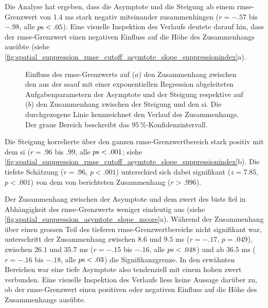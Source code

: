 \documentclass[11pt, twoside, a4paper]{book}		%
\begin{document}
Die Analyse hat ergeben, dass die Asymptote und die Steigung ab einem \gls{rmse}-Grenzwert von $1.4$ ms stark negativ miteinander zusammenhingen ($r=-.57$ bis $-.98$, alle $p\textnormal{s}<.05$). Eine visuelle Inspektion des Verlaufs deutete darauf hin, dass der \gls{rmse}-Grenzwert einen negativen Einfluss auf die Höhe des Zusammenhangs ausübte (siehe \autoref{fig:spatial_suppression_rmse_cutoff_asymtote_slope_suppressionindex}a).

\begin{figure}[htbp]
	\centering
	\begin{adjustbox}{width=1\textwidth}
	\end{adjustbox}
	\newline
	\begin{adjustbox}{width=1\textwidth}
	\end{adjustbox}
	\caption[Einfluss des \gls{rmse}-Grenzwerts der \gls{ssauf} auf den Zusammenhang zwischen der Asymptote, der Steigung und dem \gls{si}]{Einfluss des \gls{rmse}-Grenzwerts auf ($a$) den Zusammenhang zwischen den aus der \gls{ssauf} mit einer exponentiellen Regression abgeleiteten Aufgabenparametern der Asymptote und der Steigung respektive auf ($b$) den Zusammenhang zwischen der Steigung und den \gls{si}. Die durchgezogene Linie kennzeichnet den Verlauf des Zusammenhangs. Der graue Bereich beschreibt das $95\,\%$-Konfidenzintervall.}
	\label{fig:spatial_suppression_rmse_cutoff_asymtote_slope_suppressionindex}
\end{figure}

Die Steigung korrelierte über den ganzen \gls{rmse}-Grenzwertbereich stark positiv mit dem \gls{si} ($r=.96$ bis $.99$, alle $p\textnormal{s}<.001$; siehe \autoref{fig:spatial_suppression_rmse_cutoff_asymtote_slope_suppressionindex}b). Die tiefste Schätzung ($r=.96$, $p<.001$) unterschied sich dabei signifikant ($z=7.85$, $p<.001$) von dem von \citet{Melnick2013} berichteten Zusammenhang ($r>.996$).

Der Zusammenhang zwischen der Asymptote und dem \gls{zwert} des \gls{bist}s fiel in Abhängigkeit des \gls{rmse}-Grenzwerts weniger eindeutig aus (siehe \autoref{fig:spatial_suppression_asymtote_slope_zscore}a).
Während der Zusammenhang über einen grossen Teil des tieferen \gls{rmse}-Grenzwertbereichs nicht signifikant war, unterschritt der Zusammenhang zwischen $8.6$ und $9.5$ ms ($r = -.17$, $p = .049$), zwischen $26.1$ und $35.7$ ms ($r = -.15$ bis $ -.16$, alle $p\textnormal{s} < .048$) und ab $36.5$ ms ($r = -.16$ bis $-.18$, alle $p\textnormal{s} < .03$) die Signifikanzgrenze. In den erwähnten Bereichen war eine tiefe Asymptote also tendenziell mit einem hohen \gls{zwert} verbunden. Eine visuelle Inspektion des Verlaufs liess keine Aussage darüber zu, ob der  \gls{rmse}-Grenzwert einen positiven oder negativen Einfluss auf die Höhe des Zusammenhangs ausübte.
\end{document}
